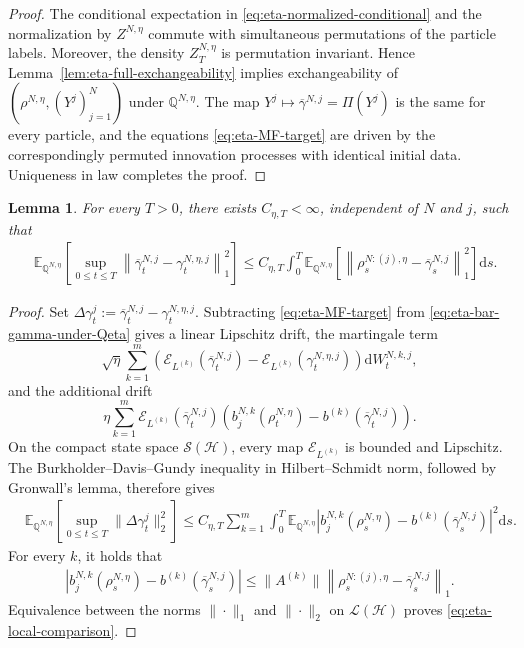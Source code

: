 \documentclass[10pt,a4paper,reqno]{amsart}
\numberwithin{equation}{section}
\theoremstyle{plain}
\newtheorem{lemma}[theorem]{Lemma}
\theoremstyle{definition}
\theoremstyle{remark}
\renewcommand{\d}{\mathrm d}
\newcommand{\E}{\mathbb E}
\newcommand{\Q}{\mathbb Q}
\newcommand{\cS}{\mathcal S}
\newcommand{\cL}{\mathcal L}
\newcommand{\cE}{\mathcal E}
\newcommand{\HH}{\mathcal H}
\newcommand{\1}{\mathbf 1}
\begin{document}
\begin{proof}
The conditional expectation in
\eqref{eq:eta-normalized-conditional} and the normalization by
$Z^{N,\eta}$ commute with simultaneous permutations of the particle labels.
Moreover, the density $Z_T^{N,\eta}$ is permutation invariant.  Hence
Lemma~\ref{lem:eta-full-exchangeability} implies exchangeability of
$(\rho^{N,\eta},(Y^j)_{j=1}^N)$ under $\Q^{N,\eta}$.  The map
$Y^j\longmapsto\overline\gamma^{N,j}=\Pi(Y^j)$ is the same for every particle,
and the equations \eqref{eq:eta-MF-target} are driven by the correspondingly
permuted innovation processes with identical initial data.  Uniqueness in
law completes the proof.
\end{proof}

\begin{lemma}
\label{lem:eta-local-comparison}
For every \(T>0\), there exists \(C_{\eta,T}<\infty\), independent of
\(N\) and \(j\), such that
\begin{equation}
\begin{aligned}
  &\E_{\Q^{N,\eta}}
  \left[
    \sup_{0\le t\le T}
    \left\|
      \overline\gamma_t^{N,j}
      -
      \gamma_t^{N,\eta,j}
    \right\|_1^2
  \right]\le
  C_{\eta,T}
  \int_0^T
  \E_{\Q^{N,\eta}}
  \left[
    \left\|
      \rho_s^{N:(j),\eta}
      -
      \overline\gamma_s^{N,j}
    \right\|_1^2
  \right]\d s.
\end{aligned}
  \label{eq:eta-local-comparison}
\end{equation}
\end{lemma}

\begin{proof}
Set
\(
  \Delta\gamma_t^j
  :=
  \overline\gamma_t^{N,j}
  -
  \gamma_t^{N,\eta,j}.
\)
Subtracting \eqref{eq:eta-MF-target} from
\eqref{eq:eta-bar-gamma-under-Qeta} gives a linear Lipschitz drift, the
martingale term
\[
  \sqrt{\eta}
  \sum_{k=1}^m
  \left(
    \cE_{L^{(k)}}(\overline\gamma_t^{N,j})
    -
    \cE_{L^{(k)}}(\gamma_t^{N,\eta,j})
  \right)\d W_t^{N,k,j},
\]
and the additional drift
\[
  \eta
  \sum_{k=1}^m
  \cE_{L^{(k)}}(\overline\gamma_t^{N,j})
  \left(
    b_j^{N,k}(\rho_t^{N,\eta})
    -
    b^{(k)}(\overline\gamma_t^{N,j})
  \right).
\]
On the compact state space \(\cS(\HH)\), every map
\(\cE_{L^{(k)}}\) is bounded and Lipschitz.  The
Burkholder--Davis--Gundy inequality in Hilbert--Schmidt norm, followed by
Gronwall's lemma, therefore gives
\[
\begin{aligned}
  &\E_{\Q^{N,\eta}}
  \left[
    \sup_{0\le t\le T}
    \|\Delta\gamma_t^j\|_2^2
  \right] \le
  C_{\eta,T}
  \sum_{k=1}^m
  \int_0^T
  \E_{\Q^{N,\eta}}
  \left|
    b_j^{N,k}(\rho_s^{N,\eta})
    -
    b^{(k)}(\overline\gamma_s^{N,j})
  \right|^2\d s.
\end{aligned}
\]
For every \(k\),  it holds that
\[
\begin{aligned}
  \left|
    b_j^{N,k}(\rho_s^{N,\eta})
    -
    b^{(k)}(\overline\gamma_s^{N,j})
  \right| \le
  \|A^{(k)}\|
  \left\|
    \rho_s^{N:(j),\eta}
    -
    \overline\gamma_s^{N,j}
  \right\|_1.
\end{aligned}
\]
Equivalence between the norms $\|\cdot\|_1$ and $\|\cdot\|_2$ on \(\cL(\HH)\)
proves \eqref{eq:eta-local-comparison}.
\end{proof}
\end{document}
